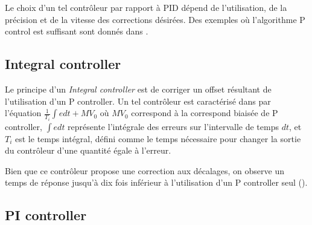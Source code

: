 Le choix d'un tel contrôleur par rapport à PID dépend de l'utilisation, de la précision et de la vitesse des corrections désirées. Des exemples où l'algorithme P control est suffisant sont donnés dans \cite{sellers2001overview}.

\subsection{Integral controller}
Le principe d'un \emph{Integral controller} est de corriger un offset résultant de l'utilisation d'un P controller. Un tel contrôleur est caractérisé dans \cite{svrcek2006real} par l'équation $\frac{1}{T_{i}}\int e dt + MV_{0}$ où $MV_{0}$ correspond à la correspond biaisée de P controller, $\int e dt$ représente l'intégrale des erreurs sur l'intervalle de temps $dt$, et $T_{i}$ est le temps intégral, défini comme le temps nécessaire pour changer la sortie du contrôleur d'une quantité égale à l'erreur.

Bien que ce contrôleur propose une correction aux décalages, on observe un temps de réponse jusqu'à dix fois inférieur à l'utilisation d'un P controller seul (\cite{svrcek2006real}).

\subsection{PI controller}

